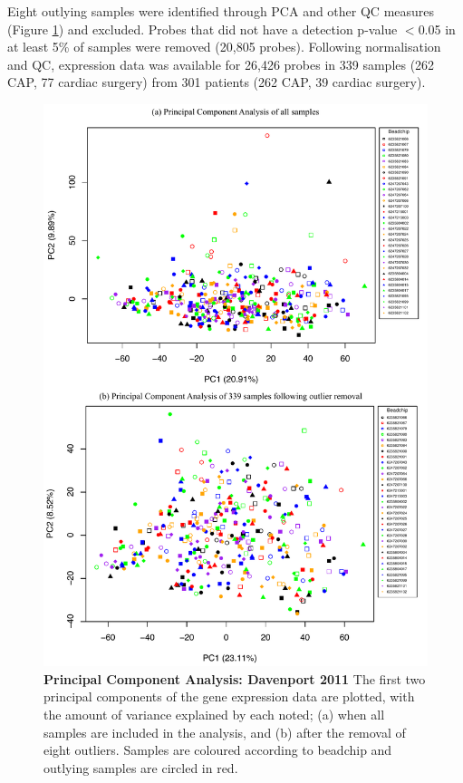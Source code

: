 Eight outlying samples were identified through PCA and other QC measures (Figure \ref{fig:PCAEmma}) and excluded. Probes that did not have a detection p-value $<$0.05 in at least 5\% of samples were removed (20,805 probes). Following normalisation and QC, expression data was available for 26,426 probes in 339 samples (262 CAP, 77 cardiac surgery) from 301 patients (262 CAP, 39 cardiac surgery).

\FloatBarrier
\begin{figure}[htbp]
\centering
\includegraphics[scale=0.75]{./Results3/Images/PCA_Davenport2011.pdf}
\caption[Principal Component Analysis: Davenport 2011]{\textbf{Principal Component Analysis: Davenport 2011} The first two principal components of the gene expression data are plotted, with the amount of variance explained by each noted; (a) when all samples are included in the analysis, and (b) after the removal of eight outliers. Samples are coloured according to beadchip and outlying samples are circled in red.}
\label{fig:PCAEmma}
\end{figure}

